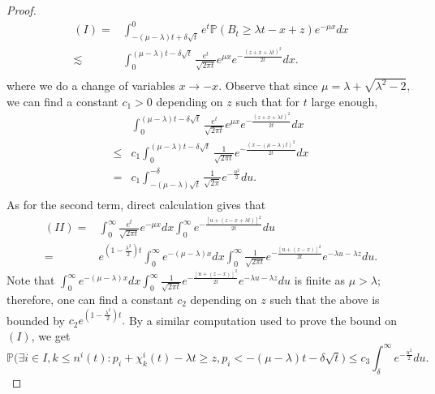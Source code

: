 \documentclass[10pt,a4paper]{amsart}
\begin{document}
\begin{proof}
  \begin{equation}
    \begin{aligned}
      (I)
     =&\int_{-(\mu-\lambda)t+\delta\sqrt{t}}^{0}e^{t}\mathbb{P}(B_{t}\ge \lambda t-x+z)e^{-\mu x}dx\\
\lesssim & \int_{0}^{(\mu-\lambda)t-\delta\sqrt{t}}\frac{e^{t}}{\sqrt{2\pi t}}e^{\mu x}e^{-\frac{(z+x+\lambda t)^{2}}{2t}}dx.\\
    \end{aligned}
  \end{equation}
  where we do a change of variables $x\to -x$. 
  Observe that since $\mu = \lambda + \sqrt{\lambda^2-2}$, we can find a constant $c_{1}>0$ depending on $z$ such that for  $t$ large enough,
  \begin{equation}
    \begin{aligned}
      &\int_{0}^{(\mu-\lambda)t-\delta\sqrt{t}}\frac{e^{t}}{\sqrt{2\pi t}}e^{\mu x}e^{-\frac{(z+x+\lambda t)^{2}}{2t}}dx\\
    \le& c_{1}\int_{0}^{(\mu-\lambda)t-\delta\sqrt{t}}\frac{1}{\sqrt{2\pi t}}e^{-\frac{(x-(\mu -\lambda)t)^{2}}{2t}}dx\\
     = & c_{1}\int_{-(\mu-\lambda)\sqrt{t}}^{-\delta}\frac{1}{\sqrt{2\pi}}e^{-\frac{u^{2}}{2}}du.\\
    \end{aligned}
  \end{equation}
  As for the second term, direct calculation gives that 
  \begin{equation}
    \begin{aligned}
      (II) 
      =&\int_{0}^{\infty}\frac{e^{t}}{\sqrt{2\pi t}}e^{-\mu x}dx\int_{0}^{\infty}e^{-\frac{[u+(z-x+\lambda t)]^{2}}{2t}}du\\
      =&e^{(1-\frac{\lambda^{2}}{2})t}\int_{0}^{\infty}e^{-(\mu-\lambda) x}dx\int_{0}^{\infty}\frac{1}{\sqrt{2\pi t}}e^{-\frac{[u+(z-x)]^{2}}{2t}}e^{-\lambda u-\lambda z}du.
    \end{aligned}
  \end{equation}
Note that $\int_{0}^{\infty}e^{-(\mu-\lambda) x}dx\int_{0}^{\infty}\frac{1}{\sqrt{2\pi t}}e^{-\frac{[u+(z-x)]^{2}}{2t}}e^{-\lambda u-\lambda z}du$ is finite as $\mu > \lambda$; therefore, one can find a constant $c_{2}$ depending on $z$ such that the above is bounded by $ c_{2}e^{(1-\frac{\lambda^{2}}{2})t}.$ 
By a similar computation used to prove the bound on $(I)$, we get
  \begin{equation}
    \mathbb{P}\biggl(\exists i\in I, k \le {n}^{i}(t):p_{i}+\chi^{i}_{k}(t)-\lambda t \ge z, p_{i}<-(\mu - \lambda)t-\delta\sqrt{t}\biggr) \le c_{3}\int_{\delta}^{\infty}e^{-\frac{u^{2}}{2}}du. \label{2.20}

\end{equation}
\end{proof}
\end{document}
